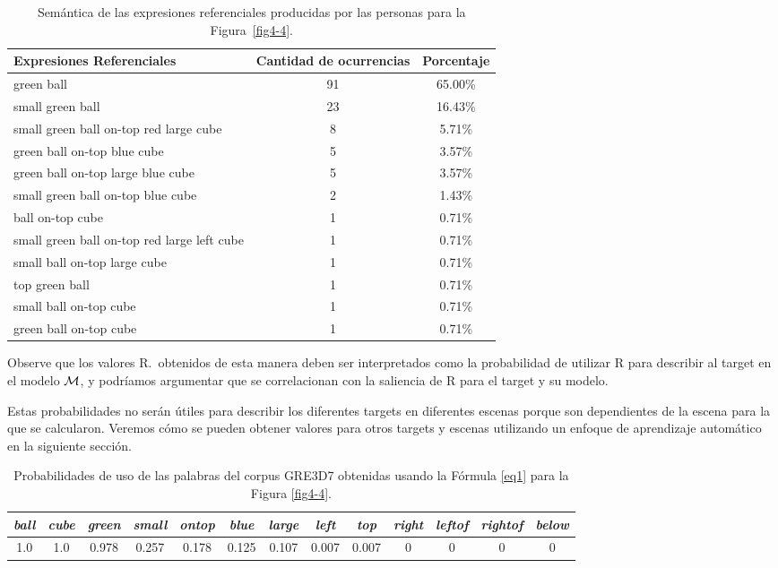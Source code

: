 \begin{table}[h!]
\begin{center}
\begin{tabular}{|l|c|c|}
\hline
Expresiones Referenciales & Cantidad de ocurrencias & Porcentaje \\
\hline

green ball & 91 & 65.00\% \\
small green ball   & 23 & 16.43\% \\
small green ball on-top red large cube & 8 & 5.71\% \\
green ball on-top blue cube & 5 & 3.57\% \\
green ball on-top large blue cube & 5 & 3.57\% \\
small green ball on-top blue cube & 2 & 1.43\% \\
ball on-top cube & 1 & 0.71\% \\
small green ball on-top red large left cube  & 1 & 0.71\% \\
small ball on-top large cube & 1 & 0.71\% \\
top green ball  & 1 & 0.71\% \\
small ball on-top cube & 1 & 0.71\% \\
green ball on-top cube & 1 & 0.71\% \\

\hline
\end{tabular}
\caption{Sem\'antica de las expresiones referenciales producidas por las personas para la Figura~\ref{fig4-4}.}\label{corpus-distribution}
\end{center}
\end{table}

Observe que los valores R.\puse\ obtenidos de esta manera deben ser
interpretados como la probabilidad de utilizar R para describir al target en el
modelo $\mathcal{M} $, y podr\'{i}amos argumentar que se correlacionan con la
 saliencia de R para el target y su modelo. 
 
Estas probabilidades no ser\'an \'utiles
para describir los diferentes targets en diferentes escenas porque son dependientes de la escena para la que se calcularon. Veremos c\'omo se
pueden obtener valores para otros targets y escenas utilizando un
enfoque de aprendizaje autom\'atico en la siguiente secci\'on. 


\begin{table}[H]
\begin{center}
\begin{tabular}{ccccccccccccc}
\hline
\it{ball} & \it{cube} &  \it{green} & \it{small} &  \it{ontop} &  \it{blue} &  \it{large} &  \it{left} &  \it{top} &\it{right} &  \it{leftof} &    \it{rightof} &\it{below} \\
\hline

1.0 & 1.0 & 0.978 &0.257 &0.178 & 0.125 &0.107  &0.007  &0.007 & 0 &0&0&0\\
\hline
\end{tabular}
\caption{Probabilidades de uso de las palabras del corpus GRE3D7 obtenidas usando la F\'ormula \ref{eq1} para la Figura \ref{fig4-4}.}  
\label{probability-of-use1}
\end{center}
\end{table}



